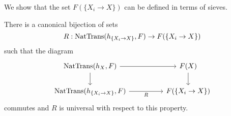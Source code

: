 We show that the set $F(\{X_{i}\to X\})$ can be defined in terms of sieves. 
\begin{proposition}\label{prop: sieve of cover}
    There is a canonical bijection of sets $$R:\mathrm{NatTrans}(h_{\{X_{i}\to X\}},F)\to F(\{X_{i}\to X\})$$ such that the diagram 
    $$%
    \begin{tikzcd}
        {\NatTrans(h_{X},F)} && {F(X)} \\
        {\NatTrans(h_{\{X_{i}\to X\}}, F)} && {F(\{X_{i}\to X\})}
        \arrow["R"', from=2-1, to=2-3]
        \arrow[from=1-3, to=2-3]
        \arrow[from=1-1, to=1-3]
        \arrow[from=1-1, to=2-1]
    \end{tikzcd}$$
    commutes and $R$ is universal with respect to this property. 
\end{proposition}
